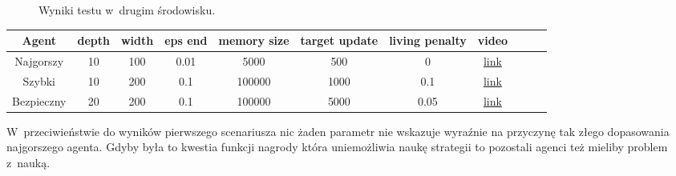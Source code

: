 \documentclass[12pt, oneside]{article}
\begin{document}
\begin{figure}[h]
    \caption{Wyniki testu w~drugim środowisku.}
\end{figure}
\begin{center}
\begin{tabular}{ |c|c|c|c|c|c|c|c|c|c|c| } 
\hline
Agent & depth & width & eps end & memory size & target update &living penalty& video\\
\hline
Najgorszy & 10 & 100 & 0.01 & 5000 & 500 &  0& \href{https://youtu.be/PT6SXxlIi_8}{link}\\
Szybki & 10 & 200 & 0.1 & 100000 & 1000 &  0.1& \href{https://youtu.be/yaug3Hmv70E}{link}\\
Bezpieczny & 20 & 200 & 0.1 & 100000 & 5000 &  0.05& \href{https://youtu.be/i--XrwREa9E}{link}\\
\hline
\end{tabular}
\end{center}
W~przeciwieństwie do wyników pierwszego scenariusza nic żaden parametr nie wskazuje wyraźnie na przyczynę tak złego dopasowania najgorszego agenta. Gdyby była to kwestia funkcji nagrody która uniemożliwia naukę strategii to pozostali agenci też mieliby problem z~nauką.
\newpage
\end{document}
